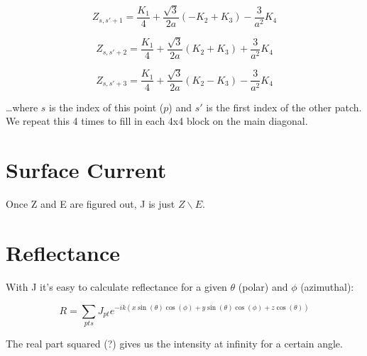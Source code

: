 \documentclass[etd,twoside,senior]{BYUPhys}
\begin{document}
\begin{equation}
  Z_{s,s'+1}=\frac{K_{1}}{4}+\frac{\sqrt{3}}{2a}\left(-K_{2}+K_{3}\right)-\frac{3}{a^{2}}K_{4}
\end{equation}

\begin{equation}
  Z_{s,s'+2}=\frac{K_{1}}{4}+\frac{\sqrt{3}}{2a}\left(K_{2}+K_{3}\right)+\frac{3}{a^{2}}K_{4}
\end{equation}

\begin{equation}
  Z_{s,s'+3}=\frac{K_{1}}{4}+\frac{\sqrt{3}}{2a}\left(K_{2}-K_{3}\right)-\frac{3}{a^{2}}K_{4}
\end{equation}

\ldots where $s$ is the index of this point ($p$) and $s'$ is the first
index of the other patch. We repeat this 4 times to fill in each 4x4
block on the main diagonal.







\section{Surface Current} \label{sec:current}

Once Z and E are figured out, J is just $Z\backslash E$.



\section{Reflectance} \label{sec:reflectance}

With J it's easy to calculate reflectance for a given $\theta$ (polar) and $\phi$ (azimuthal):

\begin{equation}
  R=\sum_{pts}J_{pt}e^{-ik\left(x\sin\left(\theta\right)\cos\left(\phi\right)+y\sin\left(\theta\right)\cos\left(\phi\right)+z\cos\left(\theta\right)\right)}
\end{equation}

The real part squared (?) gives us the intensity at infinity for a certain angle.

\end{document}
